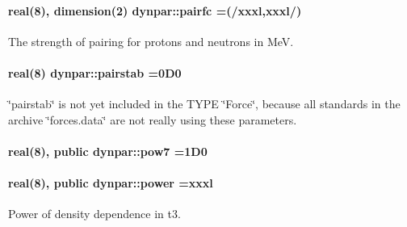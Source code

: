 \paragraph[{\texorpdfstring{pairfc}{pairfc}}]{\setlength{\rightskip}{0pt plus 5cm}real(8), dimension(2) dynpar\+::pairfc =(/xxxl,xxxl/)}\hypertarget{namespacedynpar_a851f888a2f9b400221d64c48005cb36a}{}\label{namespacedynpar_a851f888a2f9b400221d64c48005cb36a}


The strength of pairing for protons and neutrons in MeV. 

\paragraph[{\texorpdfstring{pairstab}{pairstab}}]{\setlength{\rightskip}{0pt plus 5cm}real(8) dynpar\+::pairstab =0\+D0}\hypertarget{namespacedynpar_a4b2ad788ede529a0aa5eb57e0d0af8ce}{}\label{namespacedynpar_a4b2ad788ede529a0aa5eb57e0d0af8ce}


\char`\"{}pairstab\char`\"{} is not yet included in the T\+Y\+PE \char`\"{}\+Force\char`\"{}, because all standards in the archive \char`\"{}forces.\+data\char`\"{} are not really using these parameters. 

\paragraph[{\texorpdfstring{pow7}{pow7}}]{\setlength{\rightskip}{0pt plus 5cm}real(8), public dynpar\+::pow7 =1\+D0}\hypertarget{namespacedynpar_a66a358da61845e6d07f37be5fd8e6f59}{}\label{namespacedynpar_a66a358da61845e6d07f37be5fd8e6f59}
\paragraph[{\texorpdfstring{power}{power}}]{\setlength{\rightskip}{0pt plus 5cm}real(8), public dynpar\+::power =xxxl}\hypertarget{namespacedynpar_a275f6e0333127ac2efd1cb81989daf41}{}\label{namespacedynpar_a275f6e0333127ac2efd1cb81989daf41}


Power of density dependence in \textquotesingle{}t3\textquotesingle{}. 

